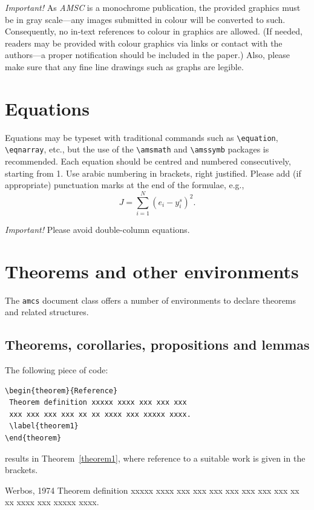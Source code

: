 \documentclass{amcs}
\begin{document}
\emph{Important!} As \emph{AMSC} is a monochrome publication, the provided graphics must be in gray scale---any images submitted in colour will be converted to such. Consequently, no in-text references to colour in graphics are allowed. (If needed, readers may be provided with colour graphics via links or contact with the authors---a proper notification should be included in the paper.) Also, please make sure that any fine line drawings such as graphs are legible.


\section{Equations}
Equations may be typeset with traditional commands such as \verb+\equation+, \verb+\eqnarray+, etc., but the use of the \verb+\amsmath+ and \verb+\amssymb+ packages is recommended. Each equation should be centred and numbered consecutively, starting from 1. Use arabic numbering in brackets, right justified. Please add (if appropriate) punctuation marks at the end of the formulae, e.g.,
%
\begin{equation}
  J=\sum_{i=1}^N(e_i-y_i^s)^2.
\end{equation}

\noindent \emph{Important!} Please avoid double-column equations.

\section{Theorems and other environments}
The \verb+amcs+ document class offers a number of environments to declare theorems and related structures.

\subsection{Theorems, corollaries, propositions and lemmas} The following piece of code:

{\small \begin{verbatim}
\begin{theorem}{Reference}
 Theorem definition xxxxx xxxx xxx xxx xxx
 xxx xxx xxx xxx xx xx xxxx xxx xxxxx xxxx.
 \label{theorem1}
\end{theorem}
\end{verbatim}}
\noindent results in Theorem~\ref{theorem1}, where reference to a suitable work is given in the brackets.

\medskip
\begin{theorem}{Werbos, 1974}
 Theorem definition xxxxx xxxx xxx xxx xxx
 xxx xxx xxx xxx xx xx xxxx xxx xxxxx xxxx.
 \label{theorem1}
\end{theorem}
\end{document}

